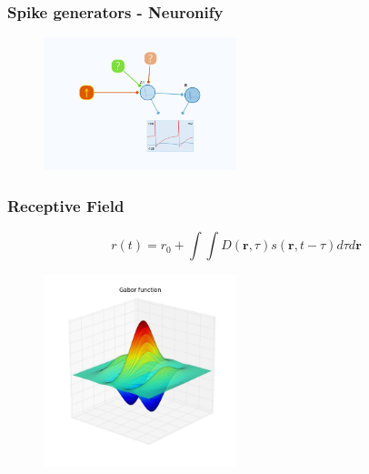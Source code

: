 \documentclass{beamer}
\begin{document}
\begin{frame}
	\frametitle{Spike generators - Neuronify}
	\begin{figure}
		\includegraphics[width = 0.5\textwidth]{figures/two_neurons_noise.png}
	\end{figure}
\end{frame}





\begin{frame}
 \frametitle{Receptive Field}


\begin{equation}
r(t) = r_0 + \displaystyle \int \int D(\mathbf{r},\tau) s(\mathbf{r},t-\tau) d\tau d\mathbf{r}
\end{equation}


\begin{figure}
 \includegraphics[width = 0.5\textwidth]{figures/gabor.png}
 \end{figure}

\end{frame}
\end{document}
